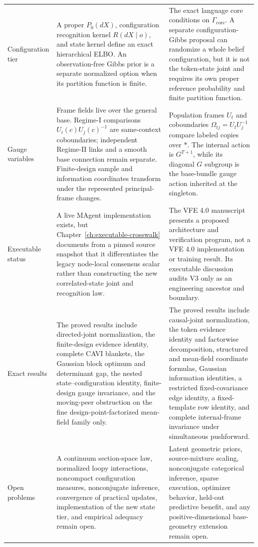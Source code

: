 \begin{longtable}{>{\raggedright\arraybackslash}p{}>{\raggedright\arraybackslash}p{}>{\raggedright\arraybackslash}p{}}
\addlinespace
Configuration tier & A proper \(P_0(dX)\), configuration recognition kernel \(R(dX\mid o)\), and state kernel define an exact hierarchical ELBO. An observation-free Gibbs prior is a separate normalized option when its partition function is finite. & The exact language core conditions on \(\Gamma_{\mathrm{core}}\). A separate configuration-Gibbs proposal can randomize a whole belief configuration, but it is not the token-state joint and requires its own proper reference probability and finite partition function. \\
\addlinespace
Gauge variables & Frame fields live over the general base. Regime-I comparisons \(U_i(c)U_j(c)^{-1}\) are same-context coboundaries; independent Regime-II links and a smooth base connection remain separate. Finite-design sample and information coordinates transform under the represented principal-frame changes. & Population frames \(U_t\) and coboundaries \(\Omega_{tj}=U_tU_j^{-1}\) compare labeled copies over \(\ast\). The internal action is \(G^{T+1}\), while its diagonal \(G\) subgroup is the base-bundle gauge action inherited at the singleton. \\
\addlinespace
Executable status & A live MAgent implementation exists, but Chapter~\ref{ch:executable-crosswalk} documents from a pinned source snapshot that it differentiates the legacy node-local consensus scalar rather than constructing the new correlated-state joint and recognition law. & The VFE 4.0 manuscript presents a proposed architecture and verification program, not a VFE 4.0 implementation or training result. Its executable discussion audits V3 only as an engineering ancestor and boundary. \\
\addlinespace
Exact results & The proved results include directed-joint normalization, the finite-design evidence identity, complete CAVI blankets, the Gaussian block optimum and determinant gap, the nested state--configuration identity, finite-design gauge invariance, and the moving-peer obstruction on the fine design-point-factorized mean-field family only. & The proved results include causal-joint normalization, the token evidence identity and factorwise decomposition, structured and mean-field coordinate formulas, Gaussian information identities, a restricted fixed-covariance edge identity, a fixed-template row identity, and complete internal-frame invariance under simultaneous pushforward. \\
\addlinespace
Open problems & A continuum section-space law, normalized loopy interactions, noncompact configuration measures, nonconjugate inference, convergence of practical updates, implementation of the new state tier, and empirical adequacy remain open. & Latent geometric priors, source-mixture scaling, nonconjugate categorical inference, sparse execution, optimizer behavior, held-out predictive benefit, and any positive-dimensional base-geometry extension remain open. \\
\end{longtable}
\normalsize

